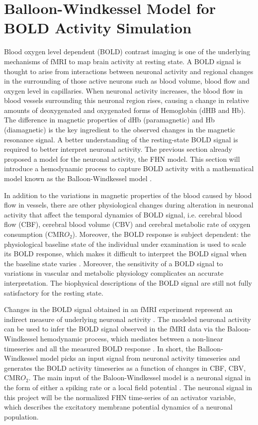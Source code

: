 \section{Balloon-Windkessel Model for BOLD Activity Simulation} 

Blood oxygen level dependent (BOLD) contrast imaging is one of the underlying mechanisms of fMRI to map brain activity at resting state. A BOLD signal is thought to arise from interactions between neuronal activity and regional changes in the surrounding of those active neurons such as blood volume, blood flow and  oxygen level in capillaries. When neuronal activity increases, the blood flow in blood vessels surrounding this neuronal region rises, causing a change in relative amounts of deoxygenated and oxygenated forms of Hemoglobin (dHB and Hb). The difference in magnetic properties of dHb (paramagnetic) and Hb (diamagnetic) is the key ingredient to the observed changes in the magnetic resonance signal. A better understanding of the resting-state BOLD signal is required to better interpret neuronal activity. The previous section already proposed  a model for the neuronal activity, the FHN model. This section will introduce a hemodynamic process to capture BOLD activity with a mathematical model known as the Balloon-Windkessel model \citep{XYZ98}. 

In addition to the variations in magnetic properties of the blood caused by blood flow in vessels, there are other physiological changes during alteration in neuronal activity that affect the temporal dynamics of BOLD signal, i.e. cerebral blood flow (CBF), cerebral blood volume (CBV) and cerebral metabolic rate of oxygen consumption (CMR$O_2$). Moreover, the BOLD response is subject dependent: the physiological baseline state of the individual under examination is used to scale its BOLD response, which makes it difficult to interpret the BOLD signal when the baseline state varies \citep{XYZ2013}. Moreover, the sensitivity of a BOLD signal to variations in vascular and metabolic physiology complicates an accurate interpretation. The biophysical descriptions of the BOLD signal are still not fully satisfactory for the resting state. 

Changes in the BOLD signal obtained in an fMRI experiment represent an indirect measure of underlying neuronal activity \citep{VUK14}. The modeled neuronal activity can be used to infer the BOLD signal observed in the fMRI data via the Baloon-Windkessel hemodynamic process, which mediates between a non-linear timeseries and all the measured BOLD response \citep{FRI00}. In short, the Balloon-Windkessel model picks an input signal from neuronal activity timeseries and generates the BOLD activity timeseries as a function of changes in CBF, CBV, CMR$O_2$. The main input of the Baloon-Windkessel model is a neuronal signal in the form of either a spiking rate or a local field potential \citep{SET12}. The neuronal signal in this project will be the normalized FHN time-series of an activator variable, which describes the excitatory membrane potential dynamics of a neuronal population.       

